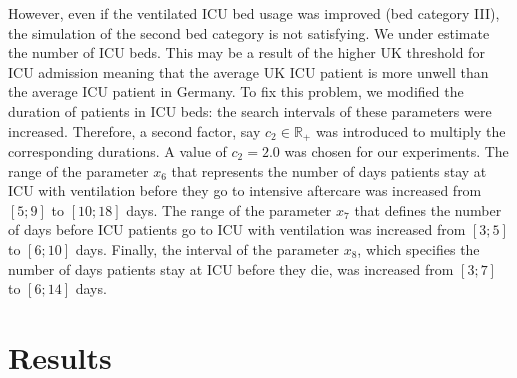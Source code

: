 \documentclass[conference]{IEEEtran}
\newcommand{\babsimhospital}{\textsc{BaBSim.Hospital}\xspace}
\begin{document}
However, even if the ventilated ICU bed usage was improved (bed category III), the simulation of the second bed category is not satisfying. We under estimate the number of ICU beds. This may be a result of the higher UK threshold for ICU admission meaning that the average UK ICU patient is more unwell than the average ICU patient in Germany. To fix this problem, we modified the duration of patients in ICU beds: the search intervals of these parameters were increased. Therefore, a second factor, say $c_2 \in \mathbb{R}_+$ was introduced to multiply the corresponding durations. A value of $c_2 = 2.0$ was chosen for our experiments.
The range of the parameter  $x_{6}$ that represents the number of days  patients stay at ICU with ventilation before they go to intensive aftercare was increased from $[5;9]$ to $[10;18]$ days. The range of the
parameter $x_{7}$  that defines the  number of days before ICU  patients go to ICU with ventilation was increased from $[3;5]$ to $[6;10]$ days. Finally, the interval of the parameter $x_{8}$, which specifies the number of days patients stay at ICU before they die, was increased from $[3;7]$ to $[6;14]$ days.


\section{Results}\label{sec:results}





\end{document}
